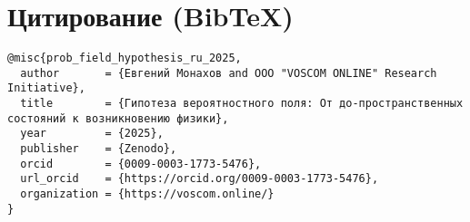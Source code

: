\documentclass[12pt,a4paper]{article}
\begin{document}
\section*{Цитирование (BibTeX)}
\begin{verbatim}
@misc{prob_field_hypothesis_ru_2025,
  author       = {Евгений Монахов and ООО "VOSCOM ONLINE" Research Initiative},
  title        = {Гипотеза вероятностного поля: От до-пространственных состояний к возникновению физики},
  year         = {2025},
  publisher    = {Zenodo},
  orcid        = {0009-0003-1773-5476},
  url_orcid    = {https://orcid.org/0009-0003-1773-5476},
  organization = {https://voscom.online/}
}
\end{verbatim}
\end{document}
